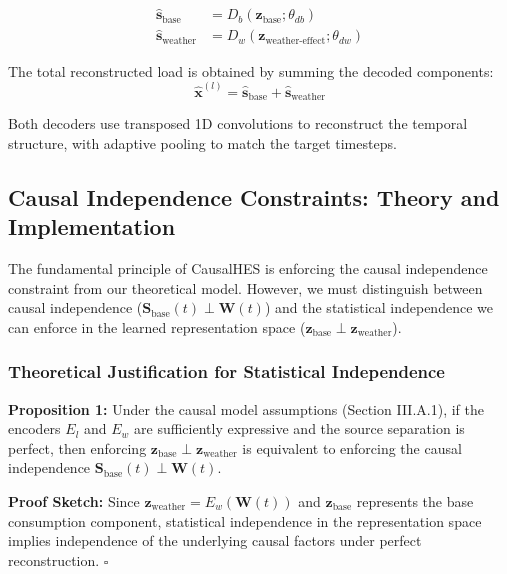 \documentclass[journal]{IEEEtran}
\begin{document}
\begin{align}
\hat{\mathbf{s}}_{\text{base}} &= D_b(\mathbf{z}_{\text{base}}; \theta_{db}) \label{eq:base_decoder}\\
\hat{\mathbf{s}}_{\text{weather}} &= D_w(\mathbf{z}_{\text{weather-effect}}; \theta_{dw}) \label{eq:weather_decoder}
\end{align}

The total reconstructed load is obtained by summing the decoded components:
\begin{equation}
\hat{\mathbf{x}}^{(l)} = \hat{\mathbf{s}}_{\text{base}} + \hat{\mathbf{s}}_{\text{weather}}
\label{eq:total_reconstruction}
\end{equation}

Both decoders use transposed 1D convolutions to reconstruct the temporal structure, with adaptive pooling to match the target timesteps.

\subsection{Causal Independence Constraints: Theory and Implementation}

The fundamental principle of CausalHES is enforcing the causal independence constraint from our theoretical model. However, we must distinguish between causal independence ($\mathbf{S}_{\text{base}}(t) \perp \mathbf{W}(t)$) and the statistical independence we can enforce in the learned representation space ($\mathbf{z}_{\text{base}} \perp \mathbf{z}_{\text{weather}}$).

\subsubsection{Theoretical Justification for Statistical Independence}

\textbf{Proposition 1:} Under the causal model assumptions (Section III.A.1), if the encoders $E_l$ and $E_w$ are sufficiently expressive and the source separation is perfect, then enforcing $\mathbf{z}_{\text{base}} \perp \mathbf{z}_{\text{weather}}$ is equivalent to enforcing the causal independence $\mathbf{S}_{\text{base}}(t) \perp \mathbf{W}(t)$.

\textbf{Proof Sketch:} Since $\mathbf{z}_{\text{weather}} = E_w(\mathbf{W}(t))$ and $\mathbf{z}_{\text{base}}$ represents the base consumption component, statistical independence in the representation space implies independence of the underlying causal factors under perfect reconstruction. $\square$
\end{document}
